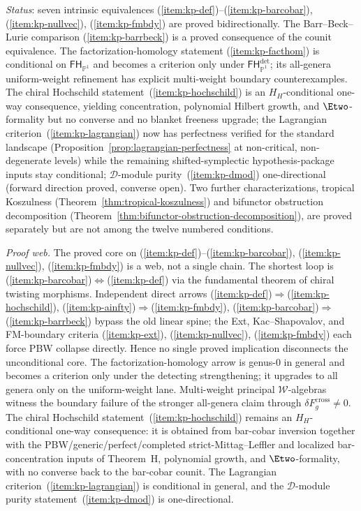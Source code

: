 \noindent
\emph{Status}: seven intrinsic equivalences
(\ref{item:kp-def})--(\ref{item:kp-barcobar}),
(\ref{item:kp-nullvec}), (\ref{item:kp-fmbdy})
are proved bidirectionally. The Barr--Beck--Lurie comparison
(\ref{item:kp-barrbeck}) is a proved consequence of the counit
equivalence. The factorization-homology statement
(\ref{item:kp-facthom}) is conditional on
$\mathsf{FH}_{\mathbb{P}^1}$ and becomes a criterion only under
$\mathsf{FH}^{\mathrm{det}}_{\mathbb{P}^1}$; its all-genera
uniform-weight refinement has explicit multi-weight boundary
counterexamples.
The chiral Hochschild statement~(\ref{item:kp-hochschild}) is an
$H_H$-conditional one-way consequence, yielding concentration,
polynomial Hilbert growth, and $\Etwo$-formality but no converse
and no blanket freeness upgrade;
the Lagrangian criterion~(\ref{item:kp-lagrangian}) now has
perfectness verified for the standard landscape
(Proposition~\ref{prop:lagrangian-perfectness} at non-critical,
non-degenerate levels) while the remaining shifted-symplectic
hypothesis-package inputs stay conditional;
$\mathcal{D}$-module purity~(\ref{item:kp-dmod})
one-directional (forward direction proved, converse open).
Two further characterizations, tropical Koszulness
(Theorem~\ref{thm:tropical-koszulness}) and
bifunctor obstruction decomposition
(Theorem~\ref{thm:bifunctor-obstruction-decomposition}),
are proved separately but are not among the twelve numbered
conditions.

\smallskip\noindent
\emph{Proof web.}
The proved core on
(\ref{item:kp-def})--(\ref{item:kp-barcobar}),
(\ref{item:kp-nullvec}), (\ref{item:kp-fmbdy})
is a web, not a single chain.
The shortest loop is
(\ref{item:kp-barcobar})$\Leftrightarrow$(\ref{item:kp-def})
via the fundamental theorem of chiral twisting morphisms.
Independent direct arrows
(\ref{item:kp-def})$\Rightarrow$(\ref{item:kp-hochschild}),
(\ref{item:kp-ainfty})$\Rightarrow$(\ref{item:kp-fmbdy}),
(\ref{item:kp-barcobar})$\Rightarrow$(\ref{item:kp-barrbeck})
bypass the old linear spine; the Ext, Kac--Shapovalov,
and FM-boundary criteria
(\ref{item:kp-ext}), (\ref{item:kp-nullvec}),
(\ref{item:kp-fmbdy})
each force PBW collapse directly.
Hence no single proved implication disconnects the unconditional
core.
The factorization-homology arrow is genus-$0$ in general and
becomes a criterion only under the detecting strengthening; it
upgrades to all genera only on the uniform-weight lane. Multi-weight
principal $\mathcal{W}$-algebras witness the boundary failure of the
stronger all-genera claim through
$\delta F_g^{\mathrm{cross}} \neq 0$.
The chiral Hochschild statement~(\ref{item:kp-hochschild}) remains an
$H_H$-conditional one-way consequence: it is obtained from bar-cobar
inversion together with the PBW/generic/perfect/completed
strict-Mittag--Leffler and localized bar-concentration inputs of
Theorem~H, polynomial growth, and $\Etwo$-formality, with no converse
back to the bar-cobar counit.
The Lagrangian criterion~(\ref{item:kp-lagrangian}) is conditional
in general, and the
$\mathcal{D}$-module purity statement~(\ref{item:kp-dmod}) is
one-directional.


